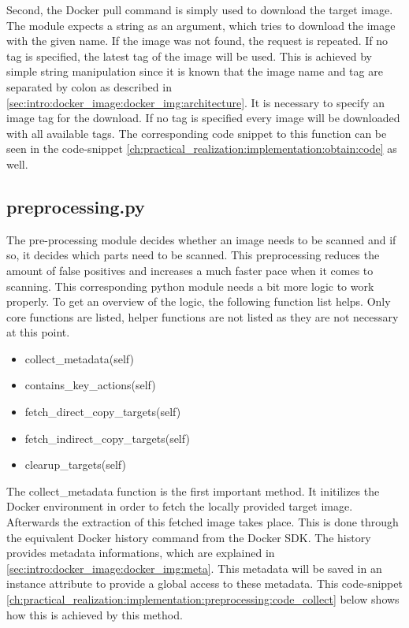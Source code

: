 Second, the Docker pull command is simply used to download the target image. The module expects a string as an argument, which tries to download the image with the given name.	
If the image was not found, the request is repeated. 
If no tag is specified, the latest tag of the image will be used. This is achieved by simple string manipulation since it is known that the image name and tag are separated by colon as described in \ref{sec:intro:docker_image:docker_img:architecture}.
It is necessary to specify an image tag for the download. If no tag is specified every image will be downloaded with all available tags. The corresponding code snippet to this function can be seen in the code-snippet \ref{ch:practical_realization:implementation:obtain:code} as well.


\subsection{preprocessing.py}
\label{ch:practical_realization:implementation:preprocessing}
The pre-processing module decides whether an image needs to be scanned and if so, it decides which parts need to be scanned. This preprocessing reduces the amount of false positives and increases a much faster pace when it comes to scanning.
This corresponding python module needs a bit more logic to work properly. To get an overview of the logic, the following function list helps. Only core functions are listed, helper functions are not listed as they are not necessary at this point.
\begin{itemize}
\item collect\_metadata(self)
\item contains\_key\_actions(self)
\item fetch\_direct\_copy\_targets(self)
\item fetch\_indirect\_copy\_targets(self)
\item clearup\_targets(self)
\end{itemize}

The collect\_metadata function is the first important method. It initilizes the Docker environment in order to fetch the locally provided target image. Afterwards the extraction of this fetched image takes place. This is done through the equivalent Docker history command from the Docker SDK. The history provides metadata informations, which are explained in \ref{sec:intro:docker_image:docker_img:meta}. This metadata will be saved in an instance attribute to provide a global access to these metadata. This code-snippet \ref{ch:practical_realization:implementation:preprocessing:code_collect} below shows how this is achieved by this method. 


